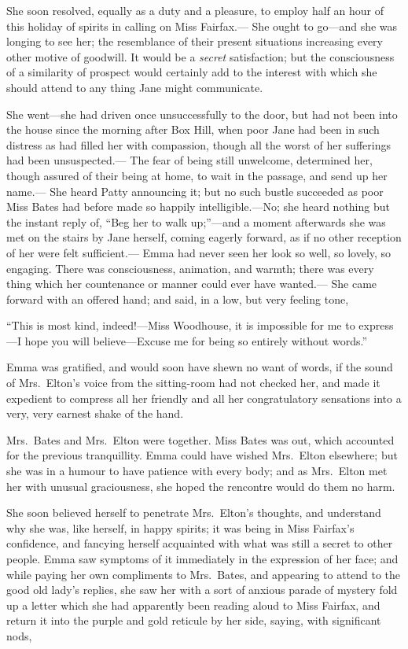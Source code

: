 She soon resolved, equally as a duty and a pleasure, to employ half
an hour of this holiday of spirits in calling on Miss Fairfax.---%
She ought to go---and she was longing to see her; the resemblance of
their present situations increasing every other motive of goodwill.
It would be a \emph{secret} satisfaction; but the consciousness of a
similarity of prospect would certainly add to the interest with
which she should attend to any thing Jane might communicate.

She went---she had driven once unsuccessfully to the door, but had
not been into the house since the morning after Box Hill, when poor
Jane had been in such distress as had filled her with compassion,
though all the worst of her sufferings had been unsuspected.---%
The fear of being still unwelcome, determined her, though assured
of their being at home, to wait in the passage, and send up her name.---%
She heard Patty announcing it; but no such bustle succeeded as poor
Miss Bates had before made so happily intelligible.---No; she heard
nothing but the instant reply of, ``Beg her to walk up;''---and a moment
afterwards she was met on the stairs by Jane herself, coming eagerly
forward, as if no other reception of her were felt sufficient.---%
Emma had never seen her look so well, so lovely, so engaging.
There was consciousness, animation, and warmth; there was every
thing which her countenance or manner could ever have wanted.---%
She came forward with an offered hand; and said, in a low, but very
feeling tone,

``This is most kind, indeed!---Miss Woodhouse, it is impossible
for me to express---I hope you will believe---Excuse me for being
so entirely without words.''

Emma was gratified, and would soon have shewn no want of words,
if the sound of Mrs.\ Elton's voice from the sitting-room had not
checked her, and made it expedient to compress all her friendly
and all her congratulatory sensations into a very, very earnest
shake of the hand.

Mrs.\ Bates and Mrs.\ Elton were together.  Miss Bates was out,
which accounted for the previous tranquillity.  Emma could have
wished Mrs.\ Elton elsewhere; but she was in a humour to have patience
with every body; and as Mrs.\ Elton met her with unusual graciousness,
she hoped the rencontre would do them no harm.

She soon believed herself to penetrate Mrs.\ Elton's thoughts,
and understand why she was, like herself, in happy spirits;
it was being in Miss Fairfax's confidence, and fancying herself
acquainted with what was still a secret to other people.
Emma saw symptoms of it immediately in the expression of her face;
and while paying her own compliments to Mrs.\ Bates, and appearing
to attend to the good old lady's replies, she saw her with a sort
of anxious parade of mystery fold up a letter which she had apparently
been reading aloud to Miss Fairfax, and return it into the purple
and gold reticule by her side, saying, with significant nods,

